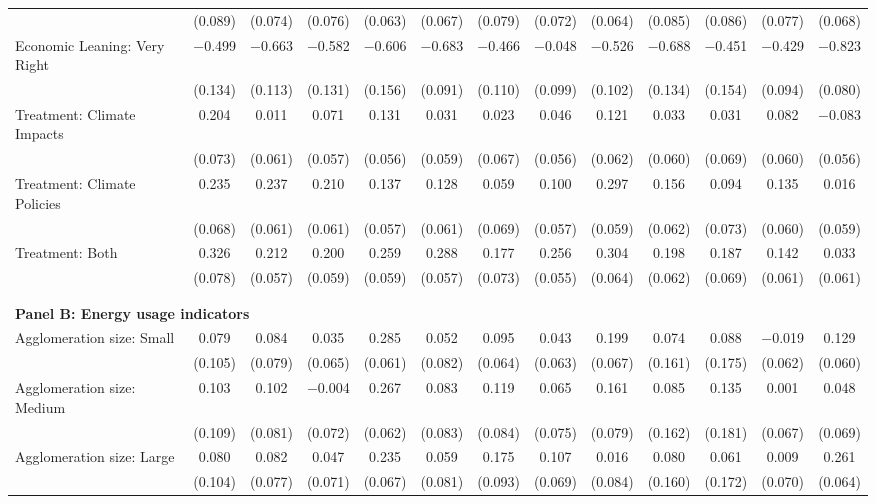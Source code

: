 \begin{tabular}{@{\extracolsep{5pt}}lcccccccccccc}
  & (0.089) & (0.074) & (0.076) & (0.063) & (0.067) & (0.079) & (0.072) & (0.064) & (0.085) & (0.086) & (0.077) & (0.068) \\ 
  Economic Leaning: Very Right & $-$0.499 & $-$0.663 & $-$0.582 & $-$0.606 & $-$0.683 & $-$0.466 & $-$0.048 & $-$0.526 & $-$0.688 & $-$0.451 & $-$0.429 & $-$0.823 \\ 
  & (0.134) & (0.113) & (0.131) & (0.156) & (0.091) & (0.110) & (0.099) & (0.102) & (0.134) & (0.154) & (0.094) & (0.080) \\ 
  Treatment: Climate Impacts & 0.204 & 0.011 & 0.071 & 0.131 & 0.031 & 0.023 & 0.046 & 0.121 & 0.033 & 0.031 & 0.082 & $-$0.083 \\ 
  & (0.073) & (0.061) & (0.057) & (0.056) & (0.059) & (0.067) & (0.056) & (0.062) & (0.060) & (0.069) & (0.060) & (0.056) \\ 
  Treatment: Climate Policies & 0.235 & 0.237 & 0.210 & 0.137 & 0.128 & 0.059 & 0.100 & 0.297 & 0.156 & 0.094 & 0.135 & 0.016 \\ 
  & (0.068) & (0.061) & (0.061) & (0.057) & (0.061) & (0.069) & (0.057) & (0.059) & (0.062) & (0.073) & (0.060) & (0.059) \\ 
  Treatment: Both & 0.326 & 0.212 & 0.200 & 0.259 & 0.288 & 0.177 & 0.256 & 0.304 & 0.198 & 0.187 & 0.142 & 0.033 \\ 
  & (0.078) & (0.057) & (0.059) & (0.059) & (0.057) & (0.073) & (0.055) & (0.064) & (0.062) & (0.069) & (0.061) & (0.061) \\ 
 \\[1ex] \hline \\[1ex]
\multicolumn{ 13 }{l}{\textbf{ Panel B: Energy usage indicators }} \\
  Agglomeration size: Small & 0.079 & 0.084 & 0.035 & 0.285 & 0.052 & 0.095 & 0.043 & 0.199 & 0.074 & 0.088 & $-$0.019 & 0.129 \\ 
  & (0.105) & (0.079) & (0.065) & (0.061) & (0.082) & (0.064) & (0.063) & (0.067) & (0.161) & (0.175) & (0.062) & (0.060) \\ 
  Agglomeration size: Medium & 0.103 & 0.102 & $-$0.004 & 0.267 & 0.083 & 0.119 & 0.065 & 0.161 & 0.085 & 0.135 & 0.001 & 0.048 \\ 
  & (0.109) & (0.081) & (0.072) & (0.062) & (0.083) & (0.084) & (0.075) & (0.079) & (0.162) & (0.181) & (0.067) & (0.069) \\ 
  Agglomeration size: Large & 0.080 & 0.082 & 0.047 & 0.235 & 0.059 & 0.175 & 0.107 & 0.016 & 0.080 & 0.061 & 0.009 & 0.261 \\ 
  & (0.104) & (0.077) & (0.071) & (0.067) & (0.081) & (0.093) & (0.069) & (0.084) & (0.160) & (0.172) & (0.070) & (0.064) \\ 

\end{tabular}
